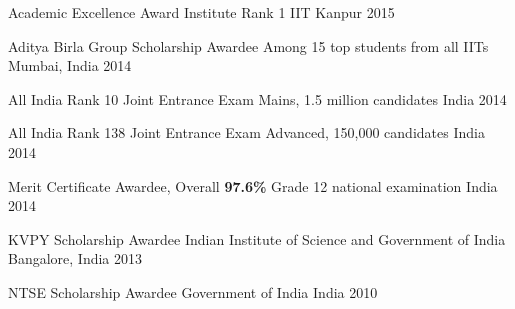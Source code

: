 
\vspace{-0.3cm}



\begin{cvhonors}


  \cvhonor
  {Academic Excellence Award} %
  {Institute Rank 1} %
  {IIT Kanpur} %
  {2015} %

  \cvhonor
  {Aditya Birla Group Scholarship Awardee}
  {Among 15 top students from all IITs}
  {Mumbai, India}
  {2014}

  \cvhonor
  {All India Rank 10} %
  {Joint Entrance Exam Mains, 1.5 million candidates} %
  {India} %
  {2014} %


  \cvhonor
  {All India Rank 138} %
  {Joint Entrance Exam Advanced, 150,000 candidates} %
  {India} %
  {2014} %

  \cvhonor
  {Merit Certificate Awardee, Overall \textbf{97.6\%}}
  {Grade 12 national examination}
  {India}
  {2014}

  \cvhonor
  {KVPY Scholarship Awardee}
  {Indian Institute of Science and Government of India}
  {Bangalore, India}
  {2013}

  \cvhonor
  {NTSE Scholarship Awardee}
  {Government of India}
  {India}
  {2010}


\end{cvhonors}

